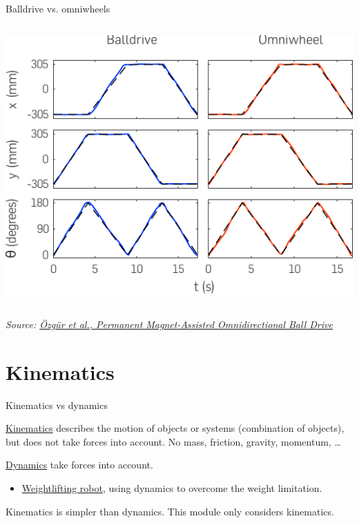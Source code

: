 \documentclass[compress]{beamer}
\newcommand{\source}[2]{{\tiny\it Source: \href{#1}{#2}}}
\begin{document}
\begin{frame}{Balldrive vs. omniwheels}
\begin{columns}
\begin{column}{0.6\linewidth}
            \includegraphics[width=\linewidth]{balldrive-vs-omniwheel}
        \end{column}
    \end{columns}

    \begin{center}

        \source{http://ayberkozgur.com/_media/publications:balldrive.pdf}{\"Ozg\"ur et al., Permanent Magnet-Assisted Omnidirectional Ball Drive}
    \end{center}

\end{frame}


\section{Kinematics}

\begin{frame}{Kinematics vs dynamics}

\href{http://en.wikipedia.org/wiki/Kinematics}{Kinematics} describes the
motion of objects or systems (combination of objects), but does not take
forces into account. No mass, friction, gravity, momentum, \ldots{}

\href{http://en.wikipedia.org/wiki/Analytical_dynamics}{Dynamics} take
forces into account.

\begin{itemize}
    \item \href{http://www.youtube.com/watch?v=kEed8DVO21I}{Weightlifting
  robot}, using dynamics to overcome the weight limitation.
\end{itemize}

Kinematics is simpler than dynamics. This module only considers
kinematics.

\end{frame}
\end{document}
